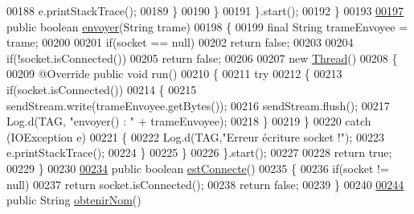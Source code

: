 \begin{DoxyCode}
00188                 e.printStackTrace();
00189             \}
00190             \}
00191         \}.start();
00192     \}
00193 
\hyperlink{classcom_1_1example_1_1ekawa_1_1_peripherique_ac1361bc1a445b00c4c7ebb56dfee274d}{00197}     \textcolor{keyword}{public} \textcolor{keywordtype}{boolean} \hyperlink{classcom_1_1example_1_1ekawa_1_1_peripherique_ac1361bc1a445b00c4c7ebb56dfee274d}{envoyer}(String trame)
00198     \{
00199         \textcolor{keyword}{final} String trameEnvoyee = trame;
00200 
00201         \textcolor{keywordflow}{if}(socket == null)
00202             \textcolor{keywordflow}{return} \textcolor{keyword}{false};
00203 
00204         \textcolor{keywordflow}{if}(!socket.isConnected())
00205             \textcolor{keywordflow}{return} \textcolor{keyword}{false};
00206 
00207         \textcolor{keyword}{new} \hyperlink{class_thread}{Thread}()
00208         \{
00209             @Override \textcolor{keyword}{public} \textcolor{keywordtype}{void} run()
00210             \{
00211                 \textcolor{keywordflow}{try}
00212                 \{
00213                     \textcolor{keywordflow}{if}(socket.isConnected())
00214                     \{
00215                         sendStream.write(trameEnvoyee.getBytes());
00216                         sendStream.flush();
00217                         Log.d(TAG, \textcolor{stringliteral}{"envoyer() : "} + trameEnvoyee);
00218                     \}
00219                 \}
00220                 \textcolor{keywordflow}{catch} (IOException e)
00221                 \{
00222                     Log.d(TAG,\textcolor{stringliteral}{"Erreur écriture socket !"});
00223                     e.printStackTrace();
00224                 \}
00225             \}
00226         \}.start();
00227 
00228         \textcolor{keywordflow}{return} \textcolor{keyword}{true};
00229     \}
00230 
\hyperlink{classcom_1_1example_1_1ekawa_1_1_peripherique_a963c20e3fba4ed926e9dee972e3b6b39}{00234}     \textcolor{keyword}{public} \textcolor{keywordtype}{boolean} \hyperlink{classcom_1_1example_1_1ekawa_1_1_peripherique_a963c20e3fba4ed926e9dee972e3b6b39}{estConnecte}()
00235     \{
00236         \textcolor{keywordflow}{if}(socket != null)
00237             \textcolor{keywordflow}{return} socket.isConnected();
00238         \textcolor{keywordflow}{return} \textcolor{keyword}{false};
00239     \}
00240 
\hyperlink{classcom_1_1example_1_1ekawa_1_1_peripherique_ad54cfafe03dfcf18cbd9b20602c4d86e}{00244}     \textcolor{keyword}{public} String \hyperlink{classcom_1_1example_1_1ekawa_1_1_peripherique_ad54cfafe03dfcf18cbd9b20602c4d86e}{obtenirNom}()

\end{DoxyCode}
